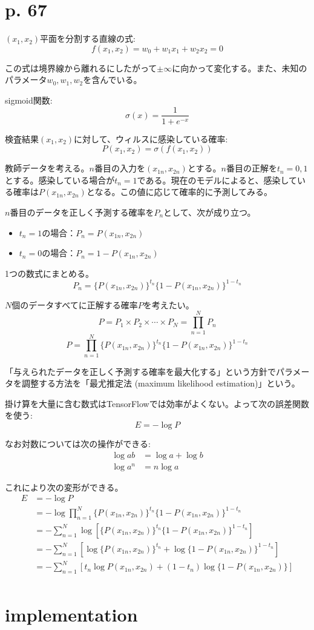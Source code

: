 \documentclass[uplatex,dvipdfmx]{jsarticle} \usepackage{amsmath,amssymb,bm}
\begin{document}
\section*{p. 67}
$(x_1,x_2)$平面を分割する直線の式:
$$f(x_1,x_2)=w_0+w_1x_1+w_2x_2=0$$

この式は境界線から離れるにしたがって$\pm\infty$に向かって変化する。また、未知のパラメータ$w_0,w_1,w_2$を含んでいる。

sigmoid関数:
$$\sigma(x)=\frac1{1+e^{-x}}$$

検査結果$(x_1,x_2)$に対して、ウィルスに感染している確率:
$$P(x_1,x_2)=\sigma(f(x_1,x_2))$$

教師データを考える。$n$番目の入力を$(x_{1n},x_{2n})$とする。$n$番目の正解を$t_n=0,1$とする。感染している場合が$t_n=1$である。現在のモデルによると、感染している確率は$P(x_{1n},x_{2n})$となる。この値に応じて確率的に予測してみる。

$n$番目のデータを正しく予測する確率を$P_n$として、次が成り立つ。
\begin{itemize}
\item $t_n=1$の場合：$P_n=P(x_{1n},x_{2n})$
\item $t_n=0$の場合：$P_n=1-P(x_{1n},x_{2n})$
\end{itemize}

1つの数式にまとめる。
$$P_n = \{P(x_{1n},x_{2n})\}^{t_n} \{1-P(x_{1n},x_{2n})\}^{1-t_n}$$

$N$個のデータすべてに正解する確率$P$を考えたい。
$$P = P_1\times P_2\times\cdots\times P_N = \prod_{n=1}^NP_n$$
$$P=\prod_{n=1}^N \{P(x_{1n},x_{2n})\}^{t_n} \{1-P(x_{1n},x_{2n})\}^{1-t_n} $$

「与えられたデータを正しく予測する確率を最大化する」という方針でパラメータを調整する方法を「最尤推定法 (maximum likelihood estimation)」という。

掛け算を大量に含む数式はTensorFlowでは効率がよくない。よって次の誤差関数を使う:
$$E=-\log P$$

なお対数については次の操作ができる:
\begin{align*}
\log ab &= \log a+\log b \\
\log a^n &= n\log a
\end{align*}

これにより次の変形ができる。
\begin{align*}
E &= -\log P \\
&= -\log\prod_{n=1}^N \{P(x_{1n},x_{2n})\}^{t_n} \{1-P(x_{1n},x_{2n})\}^{1-t_n} \\
&= -\sum_{n=1}^N \log \left[ \{P(x_{1n},x_{2n})\}^{t_n} \{1-P(x_{1n},x_{2n})\}^{1-t_n} \right] \\
&= -\sum_{n=1}^N \left[ \log \{P(x_{1n},x_{2n})\}^{t_n} + \log \{1-P(x_{1n},x_{2n})\}^{1-t_n} \right] \\
&= -\sum_{n=1}^N \left[ t_n \log P(x_{1n},x_{2n}) + (1-t_n)\log \{1-P(x_{1n},x_{2n})\} \right] \\
\end{align*}






\section*{implementation}




\vspace{\baselineskip}
\begin{paracol}{2}
\switchcolumn
\end{paracol}
\end{document}
